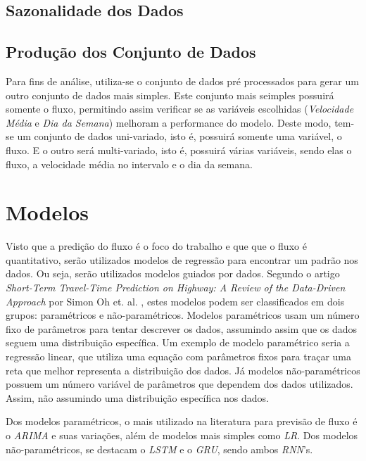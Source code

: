 \subsection{Sazonalidade dos Dados}


\subsection{Produção dos Conjunto de Dados}

Para fins de análise, utiliza-se o conjunto de dados pré processados para gerar um outro conjunto de dados mais simples. Este conjunto mais seimples possuirá somente o fluxo, permitindo assim verificar se as variáveis escolhidas (\textit{Velocidade Média} e \textit{Dia da Semana}) melhoram a performance do modelo. Deste modo, tem-se um conjunto de dados uni-variado, isto é, possuirá somente uma variável, o fluxo. E o outro será multi-variado, isto é, possuirá várias variáveis, sendo elas o fluxo, a velocidade média no intervalo e o dia da semana.

\section{Modelos}

Visto que a predição do fluxo é o foco do trabalho e que que o fluxo é quantitativo, serão utilizados modelos de regressão para encontrar um padrão nos dados. Ou seja, serão utilizados modelos guiados por dados. Segundo o artigo \textit{Short-Term Travel-Time Prediction on Highway: A Review of the Data-Driven Approach} por Simon Oh et. al. \cite{parametric}, estes modelos podem ser classificados em dois grupos: paramétricos e não-paramétricos. Modelos paramétricos usam um número fixo de parâmetros para tentar descrever os dados, assumindo assim que os dados seguem uma distribuição específica. Um exemplo de modelo paramétrico seria a regressão linear, que utiliza uma equação com parâmetros fixos para traçar uma reta que melhor representa a distribuição dos dados. Já modelos não-paramétricos possuem um número variável de parâmetros que dependem dos dados utilizados. Assim, não assumindo uma distribuição específica nos dados.

Dos modelos paramétricos, o mais utilizado na literatura para previsão de fluxo é o \textit{\acrfull{ARIMA}} e suas variações, além de modelos mais simples como \textit{\acrfull{LR}}. Dos modelos não-paramétricos, se destacam o \textit{\acrfull{LSTM}} e o \textit{\acrfull{GRU}}, sendo ambos \textit{\acrshort{RNN}}'s.

